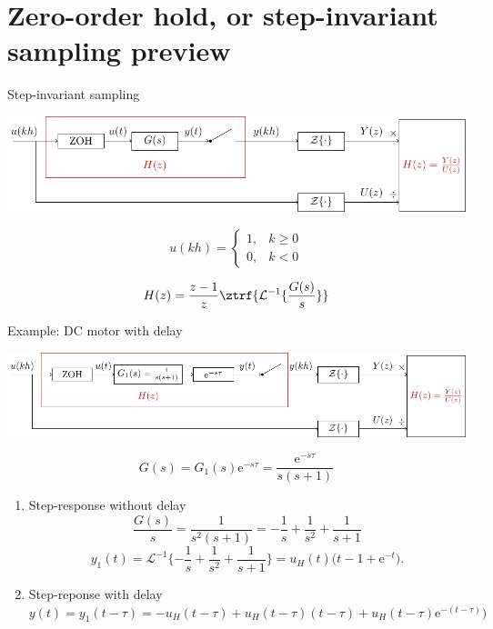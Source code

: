 \documentclass[presentation,aspectratio=169]{beamer}
\begin{document}
\section{Zero-order hold, or step-invariant sampling preview}
\label{sec:org9414dd4}
\begin{frame}[label={sec:org47398e9}]{Step-invariant sampling}
\begin{center}
\includegraphics[width=0.99\linewidth]{../../figures/invariant-sampling.pdf}
\end{center}
\[ u(kh) = \begin{cases} 1, & k \ge 0\\0, & k<0 \end{cases} \]

\begin{tcolorbox}
\[ H(z) = \frac{z-1}{z} \ztrf{\mathcal{L}^{-1}\{ \frac{G(s)}{s} \}} \]
\end{tcolorbox}
\end{frame}

\begin{frame}[label={sec:orgab84322}]{Example: DC motor with delay}
\begin{center}
\includegraphics[width=0.89\linewidth]{../../figures/invariant-sampling-dcmotor.pdf}
\end{center}
\[ G(s) = G_1(s)\mathrm{e}^{-s\tau} = \frac{\mathrm{e}^{-s\tau}}{s(s+1)}\]

\begin{enumerate}
\item \alert{Step-response without delay} \[ \frac{G(s)}{s} = \frac{1}{s^2(s+1)} = -\frac{1}{s} + \frac{1}{s^2} + \frac{1}{s+1} \]
\[ y_1(t) = \mathcal{L}^{-1} \{-\frac{1}{s} + \frac{1}{s^2} + \frac{1}{s+1}\} = u_H(t)\big(t-1+\mathrm{e}^{-t}\big).\]
\item \alert{Step-reponse with delay} \(y(t) = y_1(t-\tau) =  -u_H(t-\tau) + u_H(t-\tau)(t-\tau) + u_H(t-\tau)\mathrm{e}^{-(t-\tau)}\big)\)
\end{enumerate}
\end{frame}
\end{document}
